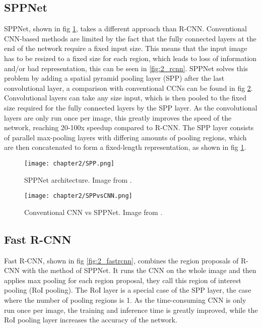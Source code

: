 \subsection{SPPNet \cite{sppnet}}
SPPNet, shown in fig \ref{fig:2_sppnet}, takes a different approach than R-CNN. Conventional CNN-based methods are limited by the fact that the fully connected layers at the end of the network require a fixed input size. This means that the input image has to be resized to a fixed size for each region, which leads to loss of information and/or bad representation, this can be seen in \ref{fig:2_rcnn}. SPPNet solves this problem by adding a spatial pyramid pooling layer (SPP) after the last convolutional layer, a comparison with conventional CCNs can be found in fig \ref{fig:2_sppnetvscnn}. Convolutional layers can take any size input, which is then pooled to the fixed size required for the fully connected layers by the SPP layer. As the convolutional layers are only run once per image, this greatly improves the speed of the network, reaching 20-100x speedup compared to R-CNN. The SPP layer consists of parallel max-pooling layers with differing amounts of pooling regions, which are then concatenated to form a fixed-length representation, as shown in fig \ref{fig:2_sppnet}.

\begin{figure}[H]
	\centering
	\texttt{[image: chapter2/SPP.png]}
	\caption{\label{fig:2_sppnet} SPPNet architecture. Image from \citet{sppnet}.}
\end{figure}

\begin{figure}[H]
	\centering
	\texttt{[image: chapter2/SPPvsCNN.png]}
	\caption{\label{fig:2_sppnetvscnn} Conventional CNN vs SPPNet. Image from \citet{sppnet}.}
\end{figure}

\subsection{Fast R-CNN \cite{fastrcnn}}
Fast R-CNN, shown in fig \ref{fig:2_fastrcnn}, combines the region proposals of R-CNN with the method of SPPNet. It runs the CNN on the whole image and then applies max pooling for each region proposal, they call this region of interest pooling (RoI pooling). The RoI layer is a special case of the SPP layer, the case where the number of pooling regions is 1. As the time-consuming CNN is only run once per image, the training and inference time is greatly improved, while the RoI pooling layer increases the accuracy of the network.

